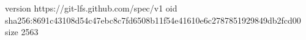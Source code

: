 version https://git-lfs.github.com/spec/v1
oid sha256:8691c43108d54c47ebc8c7fd6508b11f54e41610e6c2787851929849db2fcd00
size 2563
